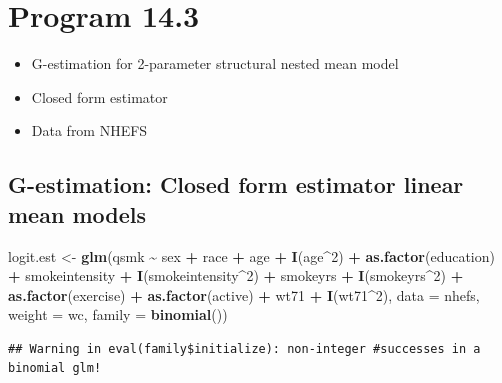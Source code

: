 \documentclass[
  10pt,
]{book}
\newenvironment{Shaded}{\begin{snugshade}}{\end{snugshade}}
\newcommand{\DataTypeTok}[1]{\textcolor[rgb]{0.13,0.29,0.53}{#1}}
\newcommand{\DecValTok}[1]{\textcolor[rgb]{0.00,0.00,0.81}{#1}}
\newcommand{\KeywordTok}[1]{\textcolor[rgb]{0.13,0.29,0.53}{\textbf{#1}}}
\newcommand{\NormalTok}[1]{#1}
\newcommand{\OperatorTok}[1]{\textcolor[rgb]{0.81,0.36,0.00}{\textbf{#1}}}
\newcommand{\StringTok}[1]{\textcolor[rgb]{0.31,0.60,0.02}{#1}}
\providecommand{\tightlist}{%
  \setlength{\itemsep}{0pt}\setlength{\parskip}{0pt}}
\begin{document}
\hypertarget{program-14.3}{%
\section{Program 14.3}\label{program-14.3}}

\begin{itemize}
\tightlist
\item
  G-estimation for 2-parameter structural nested mean model
\item
  Closed form estimator
\item
  Data from NHEFS
\end{itemize}

\hypertarget{g-estimation-closed-form-estimator-linear-mean-models}{%
\subsection{G-estimation: Closed form estimator linear mean models}\label{g-estimation-closed-form-estimator-linear-mean-models}}

\begin{Shaded}
\begin{Highlighting}[]
\NormalTok{logit.est \textless{}{-}}\StringTok{ }\KeywordTok{glm}\NormalTok{(qsmk }\OperatorTok{\textasciitilde{}}\StringTok{ }\NormalTok{sex }\OperatorTok{+}\StringTok{ }\NormalTok{race }\OperatorTok{+}\StringTok{ }\NormalTok{age }\OperatorTok{+}\StringTok{ }\KeywordTok{I}\NormalTok{(age}\OperatorTok{\^{}}\DecValTok{2}\NormalTok{) }\OperatorTok{+}\StringTok{ }\KeywordTok{as.factor}\NormalTok{(education) }
                 \OperatorTok{+}\StringTok{ }\NormalTok{smokeintensity }\OperatorTok{+}\StringTok{ }\KeywordTok{I}\NormalTok{(smokeintensity}\OperatorTok{\^{}}\DecValTok{2}\NormalTok{) }\OperatorTok{+}\StringTok{ }\NormalTok{smokeyrs }
                 \OperatorTok{+}\StringTok{ }\KeywordTok{I}\NormalTok{(smokeyrs}\OperatorTok{\^{}}\DecValTok{2}\NormalTok{) }\OperatorTok{+}\StringTok{ }\KeywordTok{as.factor}\NormalTok{(exercise) }\OperatorTok{+}\StringTok{ }\KeywordTok{as.factor}\NormalTok{(active) }
                 \OperatorTok{+}\StringTok{ }\NormalTok{wt71 }\OperatorTok{+}\StringTok{ }\KeywordTok{I}\NormalTok{(wt71}\OperatorTok{\^{}}\DecValTok{2}\NormalTok{), }\DataTypeTok{data =}\NormalTok{ nhefs, }\DataTypeTok{weight =}\NormalTok{ wc, }
                 \DataTypeTok{family =} \KeywordTok{binomial}\NormalTok{())}
\end{Highlighting}
\end{Shaded}

\begin{verbatim}
## Warning in eval(family$initialize): non-integer #successes in a binomial glm!
\end{verbatim}
\end{document}
